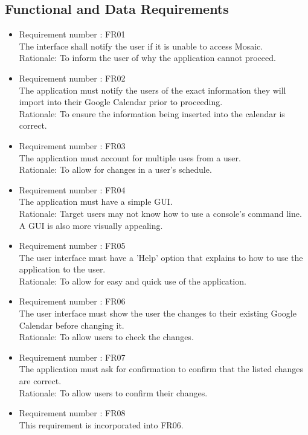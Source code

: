 \documentclass[12pt, titlepage]{article}
\begin{document}
\subsection{Functional and Data Requirements}
\begin{itemize}
\item Requirement number : FR01\\
The interface shall notify the user if it is unable to access Mosaic.\\
Rationale: To inform the user of why the application cannot proceed.
\item Requirement number : FR02\\
The application must notify the users of the exact information they will import into their Google Calendar prior to proceeding.\\
Rationale: To ensure the information being inserted into the calendar is correct.
\item Requirement number : FR03\\
The application must account for multiple uses from a user. \\
Rationale: To allow for changes in a user’s schedule.
\item Requirement number : FR04\\
The application must have a simple GUI. \\
Rationale: Target users may not know how to use a console’s command line. A GUI is also more visually appealing.
\item Requirement number : FR05\\
The user interface must have a 'Help' option that explains to how to use the application to the user.\\
Rationale: To allow for easy and quick use of the application.
\item Requirement number : FR06\\
The user interface must show the user  the changes to their existing Google Calendar before changing it. \\
Rationale: To allow users to check the changes.
\item Requirement number : FR07\\
The application must ask for confirmation to confirm that the listed changes are correct. \\
Rationale: To allow users to confirm their changes.
\color{blue}
\item Requirement number : FR08\\
This requirement is incorporated into FR06.

\end{itemize}
\end{document}
